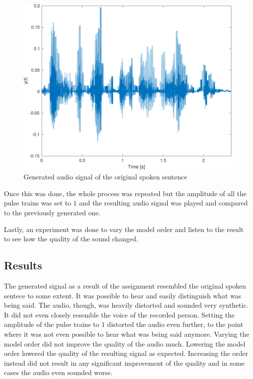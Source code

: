 \documentclass{IEEEtran}
\begin{document}
\begin{figure}[h]
  \centering
  \captionsetup{justification=centering}

  \includegraphics[width=0.8\columnwidth]{pictures/vim_gen.pdf}
  \caption{Generated audio signal of the original spoken sentence}
  \label{3:genvim}

\end{figure}

Once this was done, the whole process was repeated but the amplitude
of all the pulse trains was set to $1$ and the resulting audio signal
was played and compared to the previously generated one.

Lastly, an experiment was done to vary the model order and listen to
the result to see how the quality of the sound changed.

\subsection{Results}
The generated signal as a result of the assignment resembled the
original spoken sentece to some extent. It was possible to hear and
easily distinguish what was being said. The audio, though, was heavily
distorted and sounded very synthetic. It did not even closely resemble
the voice of the recorded person. Setting the amplitude of the pulse trains
to $1$ distorted the audio even further, to the point where it was not
even possible to hear what was being said anymore. Varying the model order
did not improve the quality of the audio much. Lowering the model order
lowered the quality of the resulting signal as expected. Increasing the
order instead did not result in any significant improvement of the
quality and in some cases the audio even sounded worse.
\end{document}
